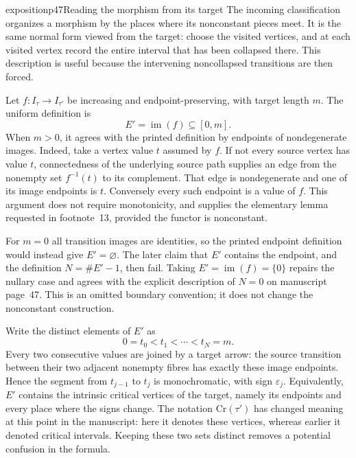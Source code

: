 \begin{dcomment}{exposition}{p47}{Reading the morphism from its target}
The incoming classification organizes a morphism by the places where its nonconstant pieces meet. It is the same normal form viewed from the target: choose the visited vertices, and at each visited vertex record the entire interval that has been collapsed there. This description is useful because the intervening noncollapsed transitions are then forced.

Let $f:I_\tau\to I_{\tau'}$ be increasing and endpoint-preserving, with target length $m$. The uniform definition is
\[
 E'=\operatorname{im}(f)\subseteq[0,m].
\]
When $m>0$, it agrees with the printed definition by endpoints of nondegenerate images. Indeed, take a vertex value $t$ assumed by $f$. If not every source vertex has value $t$, connectedness of the underlying source path supplies an edge from the nonempty set $f^{-1}(t)$ to its complement. That edge is nondegenerate and one of its image endpoints is $t$. Conversely every such endpoint is a value of $f$. This argument does not require monotonicity, and supplies the elementary lemma requested in footnote~13, provided the functor is nonconstant.

For $m=0$ all transition images are identities, so the printed endpoint definition would instead give $E'=\varnothing$. The later claim that $E'$ contains the endpoint, and the definition $N=\#E'-1$, then fail. Taking $E'=\operatorname{im}(f)=\{0\}$ repairs the nullary case and agrees with the explicit description of $N=0$ on manuscript page~47. This is an omitted boundary convention; it does not change the nonconstant construction.

Write the distinct elements of $E'$ as
\[
 0=t_0<t_1<\cdots<t_N=m.
\]
Every two consecutive values are joined by a target arrow: the source transition between their two adjacent nonempty fibres has exactly these image endpoints. Hence the segment from $t_{j-1}$ to $t_j$ is monochromatic, with sign $\varepsilon_j$. Equivalently, $E'$ contains the intrinsic critical vertices of the target, namely its endpoints and every place where the signs change. The notation $\mathrm{Cr}(\tau')$ has changed meaning at this point in the manuscript: here it denotes these vertices, whereas earlier it denoted critical intervals. Keeping these two sets distinct removes a potential confusion in the formula.


\end{dcomment}
